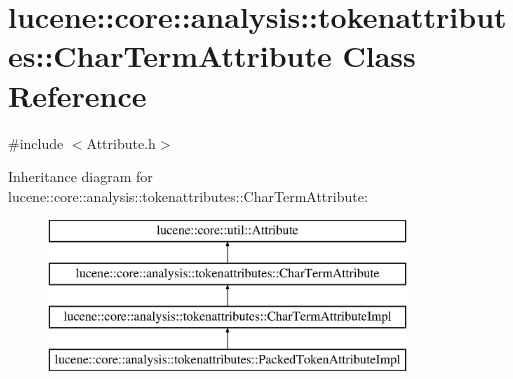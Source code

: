 \hypertarget{classlucene_1_1core_1_1analysis_1_1tokenattributes_1_1CharTermAttribute}{}\section{lucene\+:\+:core\+:\+:analysis\+:\+:tokenattributes\+:\+:Char\+Term\+Attribute Class Reference}
\label{classlucene_1_1core_1_1analysis_1_1tokenattributes_1_1CharTermAttribute}


{\ttfamily \#include $<$Attribute.\+h$>$}

Inheritance diagram for lucene\+:\+:core\+:\+:analysis\+:\+:tokenattributes\+:\+:Char\+Term\+Attribute\+:\begin{figure}[H]
\begin{center}
\leavevmode
\includegraphics[height=4.000000cm]{classlucene_1_1core_1_1analysis_1_1tokenattributes_1_1CharTermAttribute}
\end{center}
\end{figure}
